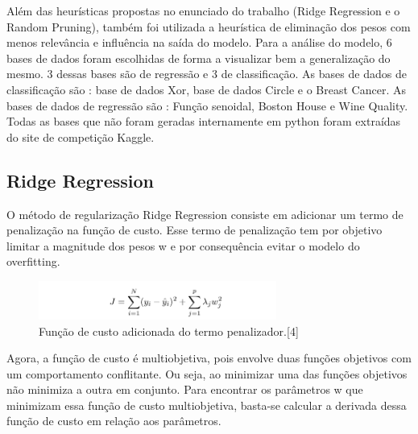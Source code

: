\documentclass{article}
\begin{document}
\vspace{15pt}

Além das heurísticas propostas no enunciado do trabalho (Ridge Regression e o Random Pruning), também foi utilizada a heurística de eliminação dos pesos com menos relevância e influência na saída do modelo. Para a análise do modelo, 6 bases de dados foram escolhidas de forma a visualizar bem a generalização do mesmo. 3 dessas bases são de regressão e 3 de classificação. As bases de dados de classificação são : base de dados Xor, base de dados Circle e o Breast Cancer. As bases de dados de regressão são : Função senoidal, Boston House e Wine Quality. Todas as bases que não foram geradas internamente em python foram extraídas do site de competição Kaggle.

\newpage

\subsection*{Ridge Regression}

\vspace{15pt}

O método de regularização Ridge Regression consiste em adicionar um termo de penalização na função de custo. Esse termo de penalização tem por objetivo limitar a magnitude dos pesos w e por consequência evitar o modelo do overfitting.

\vspace{15pt}

\begin{figure}[h]

    \centering
    \includegraphics[height=0.5in]{funcao_custo_pen.png}
    \caption{Função de custo adicionada do termo penalizador.[4]}
    \label{fig:example}
    
\end{figure}

\vspace{15pt}

Agora, a função de custo é multiobjetiva, pois envolve duas funções objetivos com um comportamento conflitante. Ou seja, ao minimizar uma das funções objetivos não minimiza a outra em conjunto. Para encontrar os parâmetros w que minimizam essa função de custo multiobjetiva, basta-se calcular a derivada dessa função de custo em relação aos parâmetros.
\end{document}
